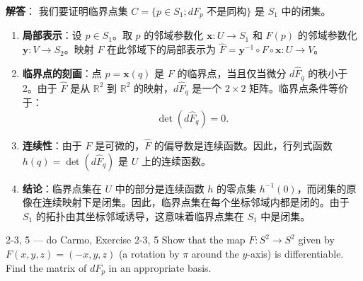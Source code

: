 \begin{solution}
\textbf{解答}：
我们要证明临界点集 $C = \{p \in S_1; dF_p \text{ 不是同构}\}$ 是 $S_1$ 中的闭集。

\begin{enumerate}
    \item \textbf{局部表示}：设 $p \in S_1$。取 $p$ 的邻域参数化 $\mathbf{x}: U \to S_1$ 和 $F(p)$ 的邻域参数化 $\mathbf{y}: V \to S_2$。映射 $F$ 在此邻域下的局部表示为 $\hat{F} = \mathbf{y}^{-1} \circ F \circ \mathbf{x}: U \to V$。
    \item \textbf{临界点的刻画}：点 $p = \mathbf{x}(q)$ 是 $F$ 的临界点，当且仅当微分 $d\hat{F}_q$ 的秩小于 2。由于 $\hat{F}$ 是从 $\mathbb{R}^2$ 到 $\mathbb{R}^2$ 的映射，$d\hat{F}_q$ 是一个 $2 \times 2$ 矩阵。临界点条件等价于：
    \[
    \det(d\hat{F}_q) = 0.
    \]
    \item \textbf{连续性}：由于 $F$ 是可微的，$\hat{F}$ 的偏导数是连续函数。因此，行列式函数 $h(q) = \det(d\hat{F}_q)$ 是 $U$ 上的连续函数。
    \item \textbf{结论}：临界点集在 $U$ 中的部分是连续函数 $h$ 的零点集 $h^{-1}(0)$，而闭集的原像在连续映射下是闭集。因此，临界点集在每个坐标邻域内都是闭的。由于 $S_1$ 的拓扑由其坐标邻域诱导，这意味着临界点集在 $S_1$ 中是闭集。
\end{enumerate}
\end{solution}

\begin{exercise}{2-3, 5 — do Carmo, Exercise 2-3, 5}
Show that the map $F: S^2 \to S^2$ given by $F(x,y,z) = (-x,y,z)$ (a rotation by $\pi$ around the $y$-axis) is differentiable. Find the matrix of $dF_p$ in an appropriate basis.
\end{exercise}

